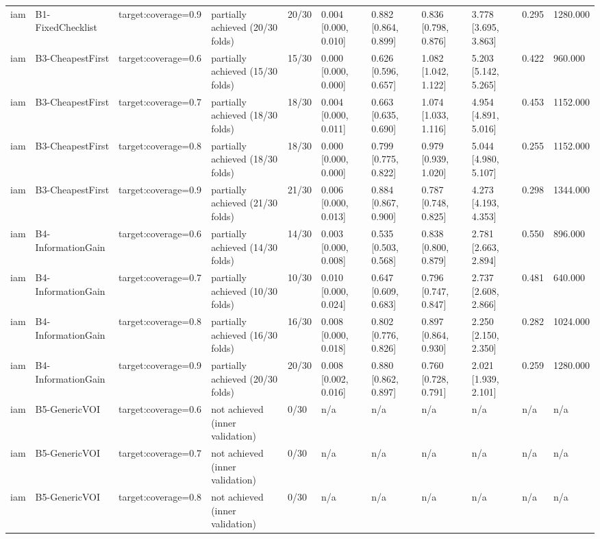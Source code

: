 \begin{table}[!ht]
{\begin{tabular}{lllllllllll}
iam & B1-FixedChecklist & target:coverage=0.9 & partially achieved (20/30 folds) & 20/30 & 0.004 [0.000, 0.010] & 0.882 [0.864, 0.899] & 0.836 [0.798, 0.876] & 3.778 [3.695, 3.863] & 0.295 & 1280.000 \\
iam & B3-CheapestFirst & target:coverage=0.6 & partially achieved (15/30 folds) & 15/30 & 0.000 [0.000, 0.000] & 0.626 [0.596, 0.657] & 1.082 [1.042, 1.122] & 5.203 [5.142, 5.265] & 0.422 & 960.000 \\
iam & B3-CheapestFirst & target:coverage=0.7 & partially achieved (18/30 folds) & 18/30 & 0.004 [0.000, 0.011] & 0.663 [0.635, 0.690] & 1.074 [1.033, 1.116] & 4.954 [4.891, 5.016] & 0.453 & 1152.000 \\
iam & B3-CheapestFirst & target:coverage=0.8 & partially achieved (18/30 folds) & 18/30 & 0.000 [0.000, 0.000] & 0.799 [0.775, 0.822] & 0.979 [0.939, 1.020] & 5.044 [4.980, 5.107] & 0.255 & 1152.000 \\
iam & B3-CheapestFirst & target:coverage=0.9 & partially achieved (21/30 folds) & 21/30 & 0.006 [0.000, 0.013] & 0.884 [0.867, 0.900] & 0.787 [0.748, 0.825] & 4.273 [4.193, 4.353] & 0.298 & 1344.000 \\
iam & B4-InformationGain & target:coverage=0.6 & partially achieved (14/30 folds) & 14/30 & 0.003 [0.000, 0.008] & 0.535 [0.503, 0.568] & 0.838 [0.800, 0.879] & 2.781 [2.663, 2.894] & 0.550 & 896.000 \\
iam & B4-InformationGain & target:coverage=0.7 & partially achieved (10/30 folds) & 10/30 & 0.010 [0.000, 0.024] & 0.647 [0.609, 0.683] & 0.796 [0.747, 0.847] & 2.737 [2.608, 2.866] & 0.481 & 640.000 \\
iam & B4-InformationGain & target:coverage=0.8 & partially achieved (16/30 folds) & 16/30 & 0.008 [0.000, 0.018] & 0.802 [0.776, 0.826] & 0.897 [0.864, 0.930] & 2.250 [2.150, 2.350] & 0.282 & 1024.000 \\
iam & B4-InformationGain & target:coverage=0.9 & partially achieved (20/30 folds) & 20/30 & 0.008 [0.002, 0.016] & 0.880 [0.862, 0.897] & 0.760 [0.728, 0.791] & 2.021 [1.939, 2.101] & 0.259 & 1280.000 \\
iam & B5-GenericVOI & target:coverage=0.6 & not achieved (inner validation) & 0/30 & n/a & n/a & n/a & n/a & n/a & n/a \\
iam & B5-GenericVOI & target:coverage=0.7 & not achieved (inner validation) & 0/30 & n/a & n/a & n/a & n/a & n/a & n/a \\
iam & B5-GenericVOI & target:coverage=0.8 & not achieved (inner validation) & 0/30 & n/a & n/a & n/a & n/a & n/a & n/a \\

\end{tabular}}
\end{table}
